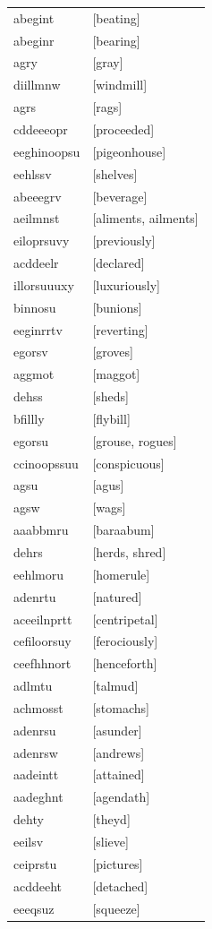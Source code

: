 \documentclass{article}
\begin{document}
\begin{tabular}{ll}
abegint & [beating] \\
abeginr & [bearing] \\
agry & [gray] \\
diillmnw & [windmill] \\
agrs & [rags] \\
cddeeeopr & [proceeded] \\
eeghinoopsu & [pigeonhouse] \\
eehlssv & [shelves] \\
abeeegrv & [beverage] \\
aeilmnst & [aliments, ailments] \\
eiloprsuvy & [previously] \\
acddeelr & [declared] \\
illorsuuuxy & [luxuriously] \\
binnosu & [bunions] \\
eeginrrtv & [reverting] \\
egorsv & [groves] \\
aggmot & [maggot] \\
dehss & [sheds] \\
bfillly & [flybill] \\
egorsu & [grouse, rogues] \\
ccinoopssuu & [conspicuous] \\
agsu & [agus] \\
agsw & [wags] \\
aaabbmru & [baraabum] \\
dehrs & [herds, shred] \\
eehlmoru & [homerule] \\
adenrtu & [natured] \\
aceeilnprtt & [centripetal] \\
cefiloorsuy & [ferociously] \\
ceefhhnort & [henceforth] \\
adlmtu & [talmud] \\
achmosst & [stomachs] \\
adenrsu & [asunder] \\
adenrsw & [andrews] \\
aadeintt & [attained] \\
aadeghnt & [agendath] \\
dehty & [theyd] \\
eeilsv & [slieve] \\
ceiprstu & [pictures] \\
acddeeht & [detached] \\
eeeqsuz & [squeeze] \\

\end{tabular}
\end{document}
